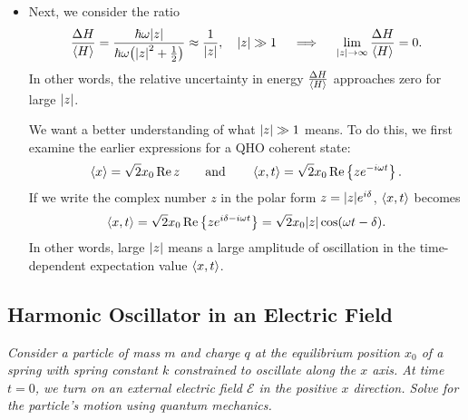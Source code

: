 \documentclass[11pt, a4paper]{article}
\newcommand{\eqtext}[1]{\qquad \text{#1} \qquad}
\begin{document}
\begin{itemize}
	\item Next, we consider the ratio
	\begin{equation*}
		\frac{\Delta H}{\ev{H}} = \frac{\hbar \omega \abs{z}}{\hbar \omega \big(\abs{z}^{2} + \tfrac{1}{2}\big)} \approx \frac{1}{\abs{z}}, \quad \abs{z} \gg 1 \quad \implies \quad \lim_{\abs{z} \to \infty} \frac{\Delta H}{\ev{H}} = 0.
	\end{equation*}
	In other words, the relative uncertainty in energy $ \frac{\Delta H}{\ev{H}} $ approaches zero for large $ \abs{z} $. 
	
	We want a better understanding of what  $ \abs{z} \gg 1 $ means. To do this, we first examine the earlier expressions for a QHO coherent state:
	\begin{equation*}
		\ev{x} = \sqrt{2}x_{0}\Re z \eqtext{and} \ev{x, t} = \sqrt{2}x_{0}\Re \left\{ze^{-i\omega t}\right\}.
	\end{equation*}
	If we write the complex number $ z $ in the polar form $ z = \abs{z}e^{i\delta} $, $ \ev{x, t}  $ becomes
	\begin{equation*}
		\ev{x, t}  =  \sqrt{2}x_{0}\Re \left\{ze^{i\delta -i\omega t}\right\} = \sqrt{2}x_{0}\abs{z}\cos(\omega t - \delta  ).
	\end{equation*}
	In other words, large $ \abs{z} $ means a large amplitude of oscillation in the time-dependent expectation value $ \ev{x, t} $. 
	
\end{itemize}

\subsection{Harmonic Oscillator in an Electric Field}
\textit{Consider a particle of mass $ m $ and charge $ q $ at the equilibrium position $ x_{0} $ of a spring with spring constant $ k $ constrained to oscillate along the $ x $ axis. At time $ t = 0 $, we turn on an external electric field $ \mathcal{E} $ in the positive $ x $ direction. Solve for the particle's motion using quantum mechanics. }
\end{document}
